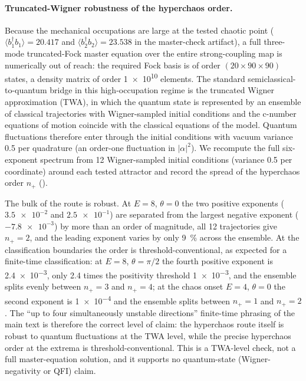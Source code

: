 \documentclass[Phys]{SciPost}
\begin{document}
\paragraph{Truncated-Wigner robustness of the hyperchaos order.}
Because the mechanical occupations are large at the tested chaotic point
($\langle b_1^\dagger b_1\rangle=\num{20.417}$ and
$\langle b_2^\dagger b_2\rangle=\num{23.538}$ in the master-check artifact),
a full three-mode truncated-Fock master equation over the entire
strong-coupling map is numerically out of reach: the required Fock basis is
of order $(20\times90\times90)$ states, a density matrix of order \num{1e10}
elements. The standard semiclassical-to-quantum bridge in this high-occupation
regime is the truncated Wigner approximation (TWA), in which the quantum state
is represented by an ensemble of classical trajectories with Wigner-sampled
initial conditions and the c-number equations of motion coincide with the
classical equations of the model. Quantum fluctuations therefore enter through
the initial conditions with vacuum variance \num{0.5} per quadrature (an
order-one fluctuation in $|\alpha|^2$). We recompute the full six-exponent
spectrum from \num{12} Wigner-sampled initial conditions (variance \num{0.5}
per coordinate) around each tested attractor and record the spread of the
hyperchaos order $n_+$ ().

The bulk of the route is robust. At $E=\num{8}$, $\theta=0$ the two positive
exponents ($\num{3.5e-2}$ and $\num{2.5e-1}$) are separated from the largest
negative exponent ($\num{-7.8e-3}$) by more than an order of magnitude, all
\num{12} trajectories give $n_+=2$, and the leading exponent varies by only
\qty{9}{\percent} across the ensemble. At the classification boundaries the
order is threshold-conventional, as expected for a finite-time classification:
at $E=\num{8}$, $\theta=\pi/2$ the fourth positive exponent is
\num{2.4e-3}, only \num{2.4} times the positivity threshold \num{1e-3}, and
the ensemble splits evenly between $n_+=3$ and $n_+=4$; at the chaos onset
$E=\num{4}$, $\theta=0$ the second exponent is \num{1e-4} and the ensemble
splits between $n_+=1$ and $n_+=2$. The ``up to four simultaneously unstable
directions'' finite-time phrasing of the main text is therefore the correct
level of claim: the hyperchaos route itself is robust to quantum fluctuations
at the TWA level, while the precise hyperchaos order at the extrema is
threshold-conventional. This is a TWA-level check, not a full master-equation
solution, and it supports no quantum-state (Wigner-negativity or QFI) claim.
\end{document}
